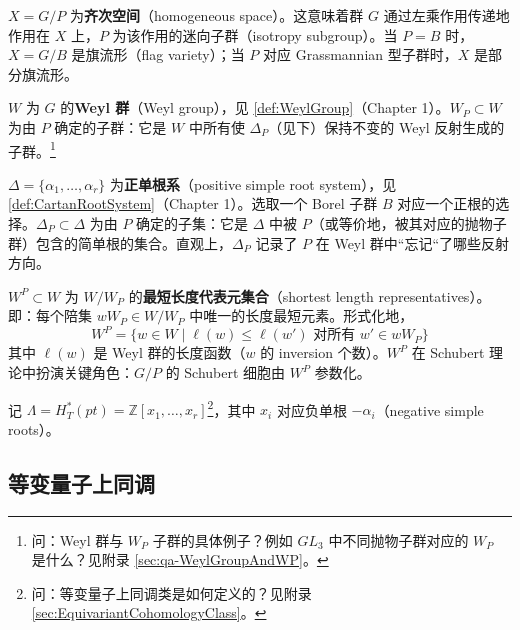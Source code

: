 \begin{Definition}
\label{def:HomogeneousSpace}
$X = G/P$ 为\textbf{齐次空间}（homogeneous space）。这意味着群 $G$ 通过左乘作用传递地作用在 $X$ 上，$P$ 为该作用的迷向子群（isotropy subgroup）。当 $P = B$ 时，$X = G/B$ 是旗流形（flag variety）；当 $P$ 对应 Grassmannian 型子群时，$X$ 是部分旗流形。
\end{Definition}

\begin{Definition}
\label{def:WeylGroupAndWP}
$W$ 为 $G$ 的\textbf{Weyl 群}（Weyl group），见 \cref{def:WeylGroup}（Chapter 1）。$W_P \subset W$ 为由 $P$ 确定的子群：它是 $W$ 中所有使 $\Delta_P$（见下）保持不变的 Weyl 反射生成的子群。\footnote{问：Weyl 群与 $W_P$ 子群的具体例子？例如 $GL_3$ 中不同抛物子群对应的 $W_P$ 是什么？见附录 \cref{sec:qa-WeylGroupAndWP}。}
\end{Definition}

\begin{Definition}
\label{def:PositiveRootSystemAndDeltaP}
$\Delta = \{\alpha_1, \ldots, \alpha_r\}$ 为\textbf{正单根系}（positive simple root system），见 \cref{def:CartanRootSystem}（Chapter 1）。选取一个 Borel 子群 $B$ 对应一个正根的选择。$\Delta_P \subset \Delta$ 为由 $P$ 确定的子集：它是 $\Delta$ 中被 $P$（或等价地，被其对应的抛物子群）包含的简单根的集合。直观上，$\Delta_P$ 记录了 $P$ 在 Weyl 群中``忘记``了哪些反射方向。
\end{Definition}

\begin{Definition}
\label{def:ShortestLengthRepresentatives}
$W^P \subset W$ 为 $W/W_P$ 的\textbf{最短长度代表元集合}（shortest length representatives）。即：每个陪集 $wW_P \in W/W_P$ 中唯一的长度最短元素。形式化地，
$$W^P = \{w \in W \mid \ell(w) \leqslant \ell(w') \text{ 对所有 } w' \in wW_P\}$$
其中 $\ell(w)$ 是 Weyl 群的长度函数（$w$ 的 inversion 个数）。$W^P$ 在 Schubert 理论中扮演关键角色：$G/P$ 的 Schubert 细胞由 $W^P$ 参数化。
\end{Definition}

记 $\Lambda = H_T^*(pt) = \mathbb{Z}[x_1, \ldots, x_r]$\footnote{问：等变量子上同调类是如何定义的？见附录 \cref{sec:EquivariantCohomologyClass}。}，其中 $x_i$ 对应负单根 $-\alpha_i$（negative simple roots）。

\subsection{等变量子上同调}

